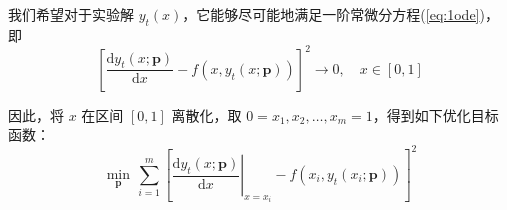 \documentclass[cn,a4paper,12pt,founder,mtpro2]{elegantpaper}
\begin{document}
\begin{enumerate}
\begin{note}
              我们希望对于实验解 $y_{t}(x)$，它能够尽可能地满足一阶常微分方程(\ref{eq:1ode})，即
              \begin{equation}
                  \left[\frac{\mathrm{d}y_{t}(x;\mathbf{p})}{\mathrm{d}x}-f\left(x,y_{t}(x;\mathbf{p})\right)\right]^{2}\rightarrow 0,\quad x\in[0,1]
              \end{equation}
              
              因此，将 $x$ 在区间 $[0,1]$ 离散化，取 $0=x_{1},x_{2},\ldots,x_{m}=1$，得到如下优化目标函数：
              \begin{equation}
                  \min_{\mathbf{p}}\,\sum_{i=1}^{m}\left[\left.\frac{\mathrm{d}y_{t}(x;\mathbf{p})}{\mathrm{d}x}\right|_{x=x_{i}}-f\left(x_{i},y_{t}(x_{i};\mathbf{p})\right)\right]^{2}
              \end{equation}
          \end{note}
\end{enumerate}
\end{document}
